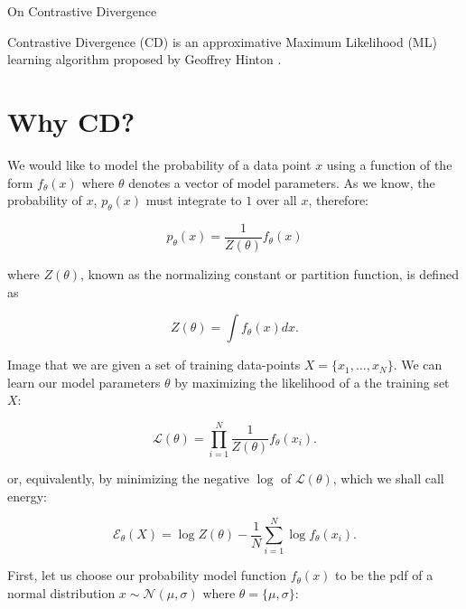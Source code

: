\documentclass[11pt]{article}
\begin{document}
\begin{center}
{\huge On Contrastive Divergence} 
\end{center}

Contrastive Divergence (CD) is an approximative Maximum Likelihood (ML) learning algorithm proposed by Geoffrey Hinton \cite{Hinton:2002, carreiraperpinan:2005}.

%

\section{Why CD?}

We would like to model the probability of a data point $x$ using a function of the form $f_\theta(x)$ where $\theta$ denotes a vector of model parameters. As we know, the probability of $x$, $p_\theta(x)$ must integrate to $1$ over all $x$, therefore:

\begin{equation}
p_\theta(x) = \frac{1}{Z(\theta)}f_\theta(x)
\end{equation}

where $Z(\theta)$, known as the normalizing constant or partition function, is defined as

\begin{equation}
Z(\theta) = \int f_\theta(x) dx.
\label{eq:partition}
\end{equation}

Image that we are given a set of training data-points $X=\{x_1,\ldots,x_N\}$. We can learn our model parameters $\theta$ by maximizing the likelihood of a the training set $X$:

\begin{equation}
\mathcal{L} (\theta) = \prod_{i=1}^N \frac{1}{Z(\theta)} f_\theta(x_i).
\end{equation}

or, equivalently, by minimizing the negative $\log$ of $\mathcal{L}(\theta)$, which we shall call energy:

\begin{equation}
\mathcal{E}_\theta(X) = \log Z(\theta) - \frac{1}{N} \sum_{i=1}^N \log f_\theta(x_i).
\label{eq:energy}
\end{equation}

First, let us choose our probability model function $f_\theta(x)$ to be the pdf of a normal distribution $x\sim\mathcal{N}(\mu, \sigma)$ where $\theta = \{\mu,\sigma\}$:
\end{document}
